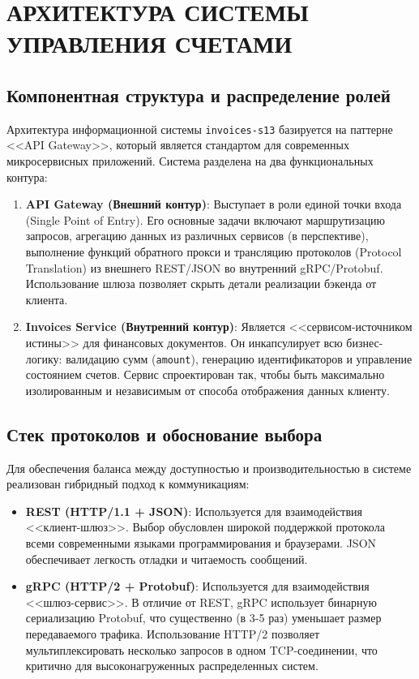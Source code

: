 \section{АРХИТЕКТУРА СИСТЕМЫ УПРАВЛЕНИЯ СЧЕТАМИ}

\subsection{Компонентная структура и распределение ролей}
Архитектура информационной системы \texttt{invoices-s13} базируется на паттерне <<API Gateway>>, который является стандартом для современных микросервисных приложений. Система разделена на два функциональных контура:

\begin{enumerate}
    \item \textbf{API Gateway (Внешний контур)}: Выступает в роли единой точки входа (Single Point of Entry). Его основные задачи включают маршрутизацию запросов, агрегацию данных из различных сервисов (в перспективе), выполнение функций обратного прокси и трансляцию протоколов (Protocol Translation) из внешнего REST/JSON во внутренний gRPC/Protobuf. Использование шлюза позволяет скрыть детали реализации бэкенда от клиента.
    \item \textbf{Invoices Service (Внутренний контур)}: Является <<сервисом-источником истины>> для финансовых документов. Он инкапсулирует всю бизнес-логику: валидацию сумм (\texttt{amount}), генерацию идентификаторов и управление состоянием счетов. Сервис спроектирован так, чтобы быть максимально изолированным и независимым от способа отображения данных клиенту.
\end{enumerate}

\subsection{Стек протоколов и обоснование выбора}
Для обеспечения баланса между доступностью и производительностью в системе реализован гибридный подход к коммуникациям:

\begin{itemize}
    \item \textbf{REST (HTTP/1.1 + JSON)}: Используется для взаимодействия <<клиент-шлюз>>. Выбор обусловлен широкой поддержкой протокола всеми современными языками программирования и браузерами. JSON обеспечивает легкость отладки и читаемость сообщений.
    \item \textbf{gRPC (HTTP/2 + Protobuf)}: Используется для взаимодействия <<шлюз-сервис>>. В отличие от REST, gRPC использует бинарную сериализацию Protobuf, что существенно (в 3-5 раз) уменьшает размер передаваемого трафика. Использование HTTP/2 позволяет мультиплексировать несколько запросов в одном TCP-соединении, что критично для высоконагруженных распределенных систем.
\end{itemize}

